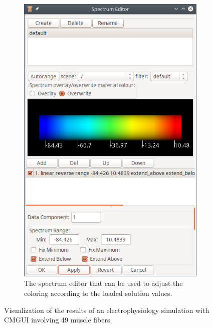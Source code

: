 \begin{figure}
\begin{subfigure}[t]{0.363\textwidth}
    \includegraphics[width=\textwidth]{images/implementation/cmgui_spectrum.png}
    \caption{The spectrum editor that can be used to adjust the coloring according to the loaded solution values.}%
    \label{fig:cmgui_spectrum}%
  \end{subfigure}
  \caption{Visualization of the results of an electrophysiology simulation with CMGUI involving 49 muscle fibers.}%
  \label{fig:cmgui_output1}%
\end{figure}%

